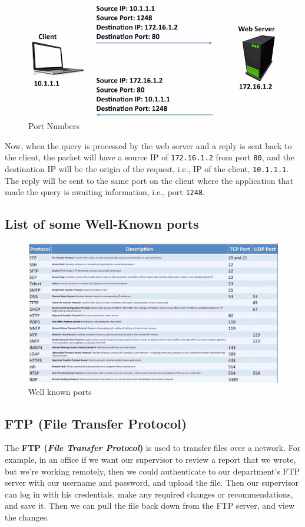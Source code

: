 \begin{figure}[h]
	\centering
	\includegraphics[width=0.9\linewidth]{"Mod1/chapters/1.1.h Port Numbers"}
	\caption{Port Numbers}
	\label{fig:1 Port Numbers}
\end{figure}

\noindent
Now, when the query is processed by the web server and a reply is sent back to the client, the packet will have a source IP of \verb|172.16.1.2| from port \verb|80|, and the destination IP will be the origin of the request, i.e., IP of the client, \verb|10.1.1.1|. The reply will be sent to the same port on the client where the application that made the query is awaiting information, i.e., port \verb|1248|. 

\subsection{List of some Well-Known ports}
\begin{figure}[h]
	\centering
	\includegraphics[width=1\linewidth]{"Mod1/chapters/1.1.i Well Known Ports"}
	\caption{Well known ports}
	\label{fig:1 Well known ports}
\end{figure}

\subsection{FTP (File Transfer Protocol)}
The \textbf{FTP (\textit{File Transfer Protocol})} is used to transfer files over a network. For example, in an office if we want our supervisor to review a report that we wrote, but we're working remotely, then we could authenticate to our department's FTP server with our username and password, and upload the file. Then our supervisor can log in with his credentials, make any required changes or recommendations, and save it. Then we can pull the file back down from the FTP server, and view the changes.

